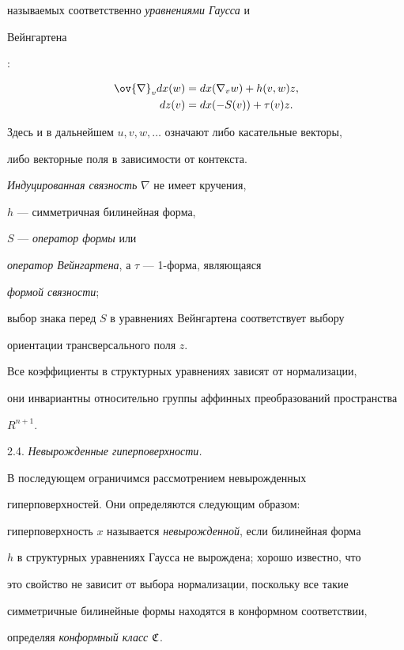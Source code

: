 называемых соответственно {\it уравнениями Гаусса} и {\it


Вейнгартена}:


\begin{align*}


\ov{\nabla} _v dx(w) & = dx(\nabla_v w) + h(v,w)z,\\


%


dz(v) & = dx(-S(v)) + \tau (v) z.


\end{align*}


Здесь и в дальнейшем $u,v,w,\dotsc$ означают либо касательные векторы,


либо векторные поля в зависимости от контекста.


{\it Индуцированная связность} $\nabla$ не имеет кручения,


$h$ --- симметричная билинейная форма,


$S$ --- {\it оператор формы} или


{\it оператор Вейнгартена}, а $\tau$ --- 1-форма, являющаяся


{\it формой связности};


выбор знака перед $S$ в уравнениях Вейнгартена соответствует выбору


ориентации трансверсального поля $z$.


Все коэффициенты в структурных уравнениях зависят от нормализации,


они инвариантны относительно группы аффинных преобразований пространства


$R^{n+1}$.


\medskip





2.4. {\it Невырожденные гиперповерхности.}


В последующем ограничимся рассмотрением невырожденных


гиперповерхностей. Они определяются следующим образом:


гиперповерхность $x$ называется {\it невырожденной}, если билинейная форма


$h$ в структурных уравнениях Гаусса не вырождена; хорошо известно, что


это свойство не зависит от выбора нормализации, поскольку все такие


симметричные билинейные формы находятся в конформном соответствии,


определяя {\it конформный класс} $\frak C$.



